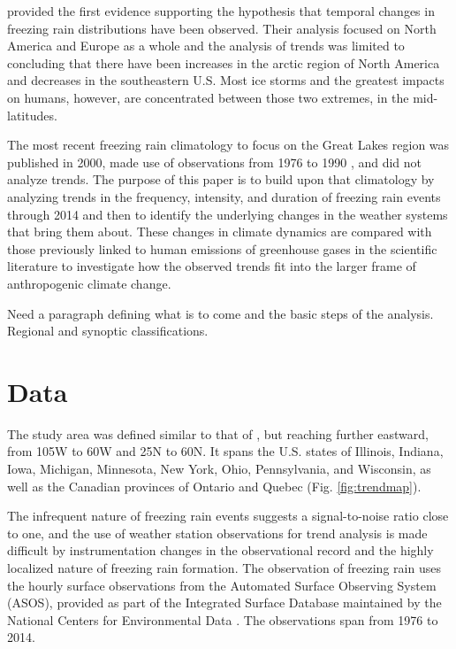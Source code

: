 \documentclass[twocol]{ametsoc}
\begin{document}
\citet{groisman2016recent} provided the first evidence supporting the hypothesis that temporal changes in freezing rain distributions have been observed. Their analysis focused on North America and Europe as a whole and the analysis of trends was limited to concluding that there have been increases in the arctic region of North America and decreases in the southeastern U.S. Most ice storms and the greatest impacts on humans, however, are concentrated between those two extremes, in the mid-latitudes.

The most recent freezing rain climatology to focus on the Great Lakes region was published in 2000, made use of observations from 1976 to 1990 \citep{cortinas2000climatology}, and did not analyze trends. The purpose of this paper is to build upon that climatology by analyzing trends in the frequency, intensity, and duration of freezing rain events through 2014 and then to identify the underlying changes in the weather systems that bring them about. These changes in climate dynamics are compared with those previously linked to human emissions of greenhouse gases in the scientific literature to investigate how the observed trends fit into the larger frame of anthropogenic climate change.

Need a paragraph defining what is to come and the basic steps of the analysis.  Regional and synoptic classifications.

\section{Data}
The study area was defined similar to that of \citet{cortinas2000climatology}, but reaching further eastward, from 105\degree W to 60\degree W and 25\degree N to 60\degree N. It spans the U.S. states of Illinois, Indiana, Iowa, Michigan, Minnesota, New York, Ohio, Pennsylvania, and Wisconsin, as well as the Canadian provinces of Ontario and Quebec (Fig. \ref{fig:trendmap}).

The infrequent nature of freezing rain events suggests a signal-to-noise ratio close to one, and the use of weather station observations for trend analysis is made difficult by instrumentation changes in the observational record and the highly localized nature of freezing rain formation.  The observation of freezing rain uses the hourly surface observations from the Automated Surface Observing System (ASOS), provided as part of the Integrated Surface Database maintained by the National Centers for Environmental Data \citep{smith2011integrated}. The observations span from 1976 to 2014.
\end{document}

